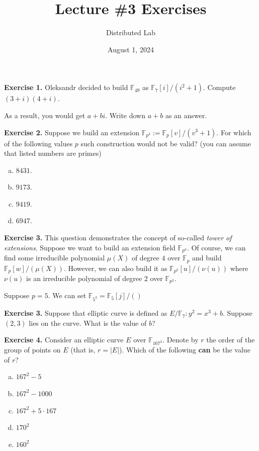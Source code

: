 \documentclass{zkdl-tests-template}
\title{\huge\sffamily\bfseries Lecture \#3 Exercises}
\author{\Large\sffamily Distributed Lab}
\date{\sffamily August 1, 2024}
\begin{document}
\pagestyle{fancy}

\maketitle

\textbf{Exercise 1.} Oleksandr decided to build $\mathbb{F}_{49}$ as $\mathbb{F}_7[i]/(i^2+1)$. Compute $(3+i)(4+i)$. 

As a result, you would get $a+bi$. Write down $a+b$ as an answer.

\textbf{Exercise 2.} Suppose we build an extension $\mathbb{F}_{p^3} := \mathbb{F}_p[v] / (v^3+1)$. For which of the following values $p$ such construction would not be valid? (you can assume that listed numbers are primes)
\begin{enumerate}[a)]
    \item $8431$.
    \item $9173$.
    \item $9419$.
    \item $6947$.
\end{enumerate}

\textbf{Exercise 3.} This question demonstrates the concept of so-called \textit{tower of extensions}. Suppose we want to build an extension field $\mathbb{F}_{p^4}$. 
Of course, we can find some irreducible polynomial $\mu(X)$ of degree $4$ over $\mathbb{F}_p$ and build $\mathbb{F}_p[w]/(\mu(X))$. However, we can also build it as $\mathbb{F}_{p^2}[u]/(\nu(u))$ where $\nu(u)$ is an irreducible polynomial of degree $2$ over $\mathbb{F}_{p^2}$.

Suppose $p=5$. We can set $\mathbb{F}_{5^2} = \mathbb{F}_{5}[j] / ()$

\textbf{Exercise 3.} Suppose that elliptic curve is defined as $E/\mathbb{F}_{7}: y^2=x^3+b$. Suppose $(2,3)$ lies on the curve. What is the value of $b$?

\textbf{Exercise 4.} Consider an elliptic curve $E$ over $\mathbb{F}_{167^2}$. Denote by $r$ the order of the group of points on $E$ (that is, $r=|E|$). Which of the following \textbf{can} be the value of $r$?
\begin{enumerate}[a)]
    \item $167^2 - 5$
    \item $167^2-1000$
    \item $167^2+5 \cdot 167$
    \item $170^2$
    \item $160^2$
\end{enumerate}
\end{document}
